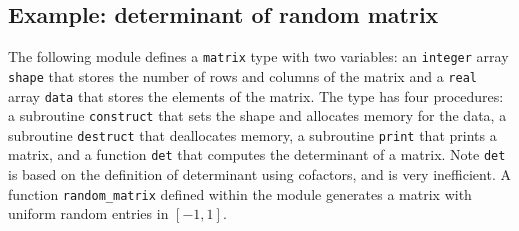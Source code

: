 \documentclass[11pt]{article}
\begin{document}
\subsection{Example: determinant of random matrix}
\label{sec:orgheadline54}
The following module defines a \texttt{matrix} type with two variables: an \texttt{integer} array \texttt{shape} that stores the number of rows and columns of the matrix and a \texttt{real} array \texttt{data} that stores the elements of the matrix. The type has four procedures: a subroutine \texttt{construct} that sets the shape and allocates memory for the data, a subroutine \texttt{destruct} that deallocates memory, a subroutine \texttt{print} that prints a matrix, and a function \texttt{det} that computes the determinant of a matrix. Note \texttt{det} is based on the definition of determinant using cofactors, and is very inefficient. A function \texttt{random\_matrix} defined within the module generates a matrix with uniform random entries in \([-1,1]\).
\end{document}
